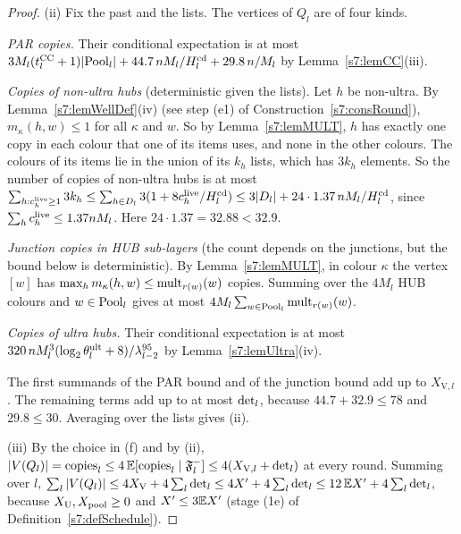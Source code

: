 \begin{proof}
(ii) Fix the past and the lists. The vertices of $Q_l$ are of four kinds.

\emph{PAR copies.} Their conditional expectation is at most
$3M_l(t^{\mathrm{CC}}_l+1)|\mathrm{Pool}_l|+44.7\,nM_l/H^{\mathrm{cd}}_l+29.8\,n/M_l$ by
Lemma~\ref{s7:lemCC}(iii).

\emph{Copies of non-ultra hubs} (deterministic given the lists). Let $h$ be
non-ultra. By Lemma~\ref{s7:lemWellDef}(iv) (see step (e1) of
Construction~\ref{s7:consRound}), $m_\kappa(h,w)\le1$ for all $\kappa$ and $w$.
So by Lemma~\ref{s7:lemMULT}, $h$ has exactly one copy in each colour that one of
its items uses, and none in the other colours. The colours of its items lie in
the union of its $k_h$ lists, which has $3k_h$ elements. So the number of copies
of non-ultra hubs is at most
$\sum_{h:c^{\mathrm{live}}_h\ge1}3k_h\le\sum_{h\in D_l}3(1+8c^{\mathrm{live}}_h/H^{\mathrm{cd}}_l)\le3|D_l|+24\cdot1.37\,nM_l/H^{\mathrm{cd}}_l$,
since $\sum_hc^{\mathrm{live}}_h\le1.37nM_l$. Here $24\cdot1.37=32.88<32.9$.

\emph{Junction copies in HUB sub-layers} (the count depends on the junctions,
but the bound below is deterministic). By
Lemma~\ref{s7:lemMULT}, in colour $\kappa$ the vertex $[w]$ has
$\max_hm_\kappa(h,w)\le\mathrm{mult}_{r(w)}(w)$ copies. Summing over the $4M_l$ HUB
colours and $w\in\mathrm{Pool}_l$ gives at most $4M_l\sum_{w\in\mathrm{Pool}_l}\mathrm{mult}_{r(w)}(w)$.

\emph{Copies of ultra hubs.} Their conditional expectation is at most
$320\,nM_l^3(\log_2\theta^{\mathrm{ult}}_l+8)/\lambda_{l-2}^{95}$ by Lemma~\ref{s7:lemUltra}(iv).

The first summands of the PAR bound and of the junction bound add up to
$X_{\mathrm{V},l}$. The remaining terms add up to at most $\mathrm{det}_l$, because
$44.7+32.9\le78$ and $29.8\le30$. Averaging over the lists gives (ii).

(iii) By the choice in (f) and by (ii),
$|V(Q_l)|=\mathrm{copies}_l\le4\,\mathbb{E}[\mathrm{copies}_l\mid\mathfrak{F}^{-}_l]\le4(X_{\mathrm{V},l}+\mathrm{det}_l)$
at every round. Summing over $l$,
$\sum_l|V(Q_l)|\le4X_{\mathrm{V}}+4\sum_l\mathrm{det}_l\le4X'+4\sum_l\mathrm{det}_l\le12\,\mathbb{E}X'+4\sum_l\mathrm{det}_l$,
because $X_{\mathrm{U}},X_{\mathrm{pool}}\ge0$ and $X'\le3\mathbb{E}X'$ (stage (1e) of
Definition~\ref{s7:defSchedule}).


\end{proof}
